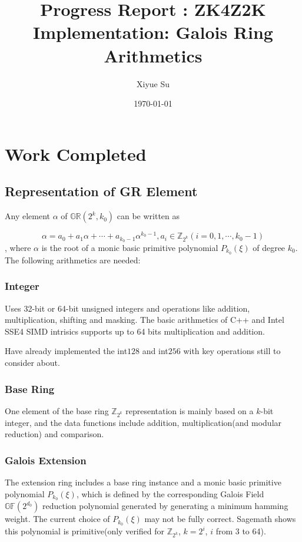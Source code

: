 \documentclass{article}
\begin{document}
\title{Progress Report : ZK4Z2K Implementation: Galois Ring Arithmetics}

\author{Xiyue Su}
\date{\today}
\maketitle



\section{Work Completed}

\subsection{Representation of GR Element}
Any element $\alpha$ of $\mathbb{GR}(2^k,k_0)$ can be written as

$$\alpha = a_0 + a_1 \alpha + \cdots + a_{k_0-1} \alpha^{k_0-1}, a_i \in \mathbb{Z}_{2^k} (i = 0, 1, \cdots , k_0 - 1)$$, where $\alpha$ is the root of a monic basic primitive polynomial $P_{k_0}(\xi)$ of
degree $k_0$. The following arithmetics are needed:

\subsubsection{Integer}
Uses 32-bit or 64-bit unsigned integers and operations like addition, multiplication, shifting and masking. The basic arithmetics of C++ and Intel SSE4 SIMD intrisics supports up to 64 bits multiplication and addition. 

Have already implemented the int$128$ and int$256$ with key operations still to consider about.

\subsubsection{Base Ring}
One element of the base ring $\mathbb{Z}_{2^k}$ representation is mainly based on a $k$-bit integer, and the data functions include addition, multiplication(and modular reduction) and comparison.


\subsubsection{Galois Extension}
The extension ring includes a base ring instance and a monic basic primitive polynomial $P_{k_0}(\xi)$, which is defined by the corresponding Galois Field $\mathbb{GF}(2^{d_0})$ reduction polynomial generated by generating a minimum hamming weight. The current choice of  $P_{k_0}(\xi)$  may not be fully correct.  Sagemath shows this polynomial is primitive(only verified for $\mathbb{Z}_{2^k}$, $k = 2^i$, $i$ from 3 to 64).
\end{document}
